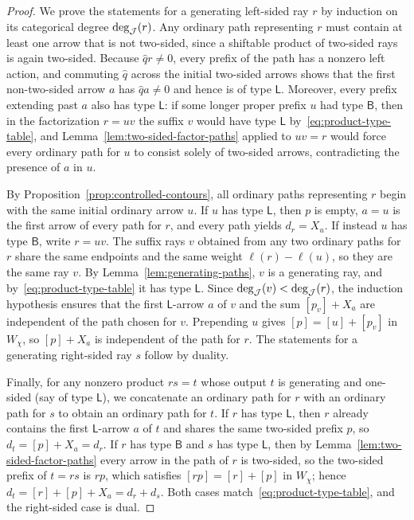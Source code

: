\begin{proof}
We prove the statements for a generating left-sided ray $r$ by induction on its categorical degree $\deg_\mathcal J(r)$. Any ordinary path representing $r$ must contain at least one arrow that is not two-sided, since a shiftable product of two-sided rays is again two-sided. Because $\widehat q r\ne0$, every prefix of the path has a nonzero left action, and commuting $\widehat q$ across the initial two-sided arrows shows that the first non-two-sided arrow $a$ has $\widehat q a\ne0$ and hence is of type $\mathsf L$. Moreover, every prefix extending past $a$ also has type $\mathsf L$: if some longer proper prefix $u$ had type $\mathsf B$, then in the factorization $r=uv$ the suffix $v$ would have type $\mathsf L$ by~\eqref{eq:product-type-table}, and Lemma~\ref{lem:two-sided-factor-paths} applied to $uv=r$ would force every ordinary path for $u$ to consist solely of two-sided arrows, contradicting the presence of $a$ in $u$.

By Proposition~\ref{prop:controlled-contours}, all ordinary paths representing $r$ begin with the same initial ordinary arrow $u$. If $u$ has type $\mathsf L$, then $p$ is empty, $a=u$ is the first arrow of every path for $r$, and every path yields $d_r=X_u$. If instead $u$ has type $\mathsf B$, write $r=uv$. The suffix rays $v$ obtained from any two ordinary paths for $r$ share the same endpoints and the same weight $\ell(r)-\ell(u)$, so they are the same ray $v$. By Lemma~\ref{lem:generating-paths}, $v$ is a generating ray, and by~\eqref{eq:product-type-table} it has type $\mathsf L$. Since $\deg_\mathcal J(v)<\deg_\mathcal J(r)$, the induction hypothesis ensures that the first $\mathsf L$-arrow $a$ of $v$ and the sum $[p_v]+X_a$ are independent of the path chosen for $v$. Prepending $u$ gives $[p]=[u]+[p_v]$ in $W_\chi$, so $[p]+X_a$ is independent of the path for $r$. The statements for a generating right-sided ray $s$ follow by duality.

Finally, for any nonzero product $rs=t$ whose output $t$ is generating and one-sided (say of type $\mathsf L$), we concatenate an ordinary path for $r$ with an ordinary path for $s$ to obtain an ordinary path for $t$. If $r$ has type $\mathsf L$, then $r$ already contains the first $\mathsf L$-arrow $a$ of $t$ and shares the same two-sided prefix $p$, so $d_t=[p]+X_a=d_r$. If $r$ has type $\mathsf B$ and $s$ has type $\mathsf L$, then by Lemma~\ref{lem:two-sided-factor-paths} every arrow in the path of $r$ is two-sided, so the two-sided prefix of $t=rs$ is $rp$, which satisfies $[rp]=[r]+[p]$ in $W_\chi$; hence $d_t=[r]+[p]+X_a=d_r+d_s$. Both cases match~\eqref{eq:product-type-table}, and the right-sided case is dual.
\end{proof}

